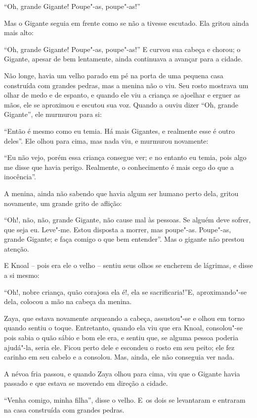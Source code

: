 ``Oh, grande Gigante! Poupe"-as, poupe"-as!''

Mas o Gigante seguia em frente como se não a tivesse escutado. Ela
gritou ainda mais alto:

``Oh, grande Gigante! Poupe"-as, poupe"-as!'' E curvou sua cabeça e
chorou; o Gigante, apesar de bem lentamente, ainda continuava a avançar
para a cidade.

Não longe, havia um velho parado em pé na porta de uma pequena casa
construída com grandes pedras, mas a menina não o viu. Seu rosto
mostrava um olhar de medo e de espanto, e quando ele viu a criança se
ajoelhar e erguer as mãos, ele se aproximou e escutou sua voz. Quando a
ouviu dizer ``Oh, grande Gigante'', ele murmurou para si:

``Então é mesmo como eu temia. Há mais Gigantes, e realmente esse é
outro deles''. Ele olhou para cima, mas nada viu, e murmurou novamente:

``Eu não vejo, porém essa criança consegue ver; e no entanto eu temia,
pois algo me disse que havia perigo. Realmente, o conhecimento é mais
cego do que a inocência''.

A menina, ainda não sabendo que havia algum ser humano perto dela,
gritou novamente, um grande grito de aflição:

``Oh!, não, não, grande Gigante, não cause mal às pessoas. Se alguém
deve sofrer, que seja eu. Leve"-me. Estou disposta a morrer, mas
poupe"-as. Poupe"-as, grande Gigante; e faça comigo o que bem entender''.
Mas o gigante não prestou atenção.

E Knoal -- pois era ele o velho -- sentiu seus olhos se encherem de
lágrimas, e disse a si mesmo:

``Oh!, nobre criança, quão corajosa ela é!, ela se sacrificaria!''E,
aproximando"-se dela, colocou a mão na cabeça da menina.

Zaya, que estava novamente arqueando a cabeça, assustou"-se e olhou em
torno quando sentiu o toque. Entretanto, quando ela viu que era Knoal,
consolou"-se pois sabia o quão sábio e bom ele era, e sentiu que, se
alguma pessoa poderia ajudá"-la, seria ele. Ficou perto dele e escondeu o
rosto em seu peito; ele fez carinho em seu cabelo e a consolou. Mas,
ainda, ele não conseguia ver nada.

A névoa fria passou, e quando Zaya olhou para cima, viu que o Gigante
havia passado e que estava se movendo em direção a cidade.

``Venha comigo, minha filha'', disse o velho. E~os dois se levantaram e
entraram na casa construída com grandes pedras.

